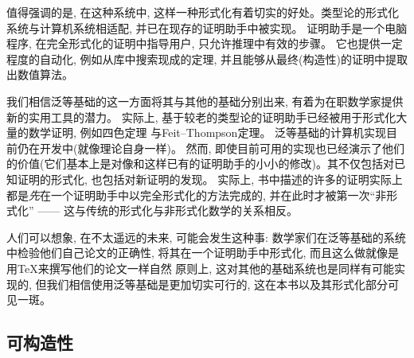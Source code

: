 值得强调的是, 在这种系统中, 这样一种形式化有着切实的好处。类型论的形式化系统与计算机系统相适配, 并已在现存的证明助手中被实现。
%
证明助手是一个电脑程序, 在完全形式化的证明中指导用户, 只允许推理中有效的步骤。
它也提供一定程度的自动化, 例如从库中搜索现成的定理, 并且能够从最终(构造性)的证明中提取出数值算法。 

我们相信泛等基础的这一方面将其与其他的基础分别出来, 有着为在职数学家提供新的实用工具的潜力。
实际上, 基于较老的类型论的证明助手已经被用于形式化大量的数学证明, 例如四色定理 与Feit--Thompson定理。
泛等基础的计算机实现目前仍在开发中(就像理论自身一样)。
%
然而, 即使目前可用的实现也已经演示了他们的价值(它们基本上是对像\Coq 和\Agda 这样已有的证明助手的小小的修改)。其不仅包括对已知证明的形式化, 也包括对新证明的发现。
实际上, 书中描述的许多的证明实际上都是\emph{先}在一个证明助手中以完全形式化的方法完成的, 并在此时才被第一次``非形式化'' —— 这与传统的形式化与非形式化数学的关系相反。

人们可以想象, 在不太遥远的未来, 可能会发生这种事: 数学家们在泛等基础的系统中检验他们自己论文的正确性, 将其在一个证明助手中形式化, 而且这么做就像是用\TeX 来撰写他们的论文一样自然
原则上, 这对其他的基础系统也是同样有可能实现的, 但我们相信使用泛等基础是更加切实可行的, 这在本书以及其形式化部分可见一斑。

%
%
%
%

\subsection*{可构造性} 

%

